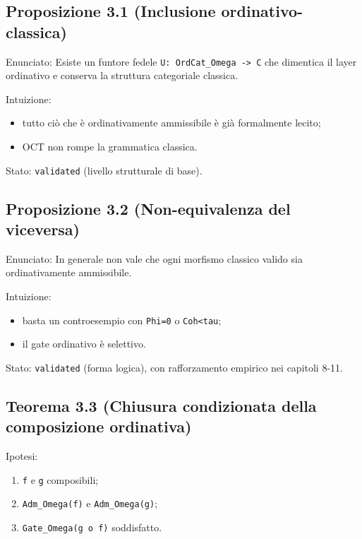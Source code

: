 \subsection{Proposizione 3.1 (Inclusione ordinativo-classica)}

Enunciato:
Esiste un funtore fedele \texttt{U:\ OrdCat\_Omega\ -\textgreater{}\ C} che dimentica il layer ordinativo e conserva la struttura categoriale classica.

Intuizione:

\begin{itemize}
\tightlist
\item
  tutto ciò che è ordinativamente ammissibile è già formalmente lecito;
\item
  OCT non rompe la grammatica classica.
\end{itemize}

Stato: \texttt{validated} (livello strutturale di base).

\subsection{Proposizione 3.2 (Non-equivalenza del viceversa)}

Enunciato:
In generale non vale che ogni morfismo classico valido sia ordinativamente ammissibile.

Intuizione:

\begin{itemize}
\tightlist
\item
  basta un controesempio con \texttt{Phi=0} o \texttt{Coh\textless{}tau};
\item
  il gate ordinativo è selettivo.
\end{itemize}

Stato: \texttt{validated} (forma logica), con rafforzamento empirico nei capitoli 8-11.

\subsection{Teorema 3.3 (Chiusura condizionata della composizione ordinativa)}

Ipotesi:

\begin{enumerate}
\def\labelenumi{\arabic{enumi}.}
\tightlist
\item
  \texttt{f} e \texttt{g} composibili;
\item
  \texttt{Adm\_Omega(f)} e \texttt{Adm\_Omega(g)};
\item
  \texttt{Gate\_Omega(g\ o\ f)} soddisfatto.
\end{enumerate}

